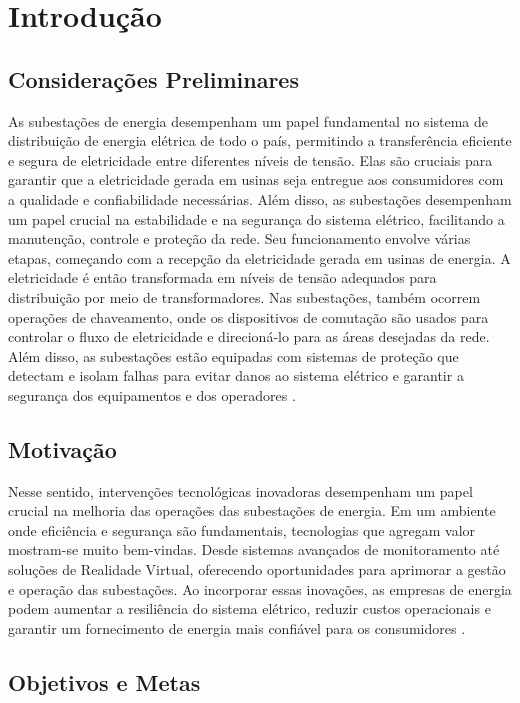 \chapter{Introdução}

\section{Considerações Preliminares}

As subestações de energia desempenham um papel fundamental no sistema de distribuição de energia elétrica de todo o país, permitindo a transferência eficiente e segura de eletricidade entre diferentes níveis de tensão. Elas são cruciais para garantir que a eletricidade gerada em usinas seja entregue aos consumidores com a qualidade e confiabilidade necessárias. Além disso, as subestações desempenham um papel crucial na estabilidade e na segurança do sistema elétrico, facilitando a manutenção, controle e proteção da rede. Seu funcionamento envolve várias etapas, começando com a recepção da eletricidade gerada em usinas de energia. A eletricidade é então transformada em níveis de tensão adequados para distribuição por meio de transformadores. Nas subestações, também ocorrem operações de chaveamento, onde os dispositivos de comutação são usados para controlar o fluxo de eletricidade e direcioná-lo para as áreas desejadas da rede. Além disso, as subestações estão equipadas com sistemas de proteção que detectam e isolam falhas para evitar danos ao sistema elétrico e garantir a segurança dos equipamentos e dos operadores \cite{randolph2013electric}.

\section{Motivação}
\label{sec:motivation}

Nesse sentido, intervenções tecnológicas inovadoras desempenham um papel crucial na melhoria das operações das subestações de energia. Em um ambiente onde eficiência e segurança são fundamentais, tecnologias que agregam valor mostram-se muito bem-vindas. Desde sistemas avançados de monitoramento até soluções de Realidade Virtual, oferecendo oportunidades para aprimorar a gestão e operação das subestações. Ao incorporar essas inovações, as empresas de energia podem aumentar a resiliência do sistema elétrico, reduzir custos operacionais e garantir um fornecimento de energia mais confiável para os consumidores \cite{zhou2016big}.

\section{Objetivos e Metas}

